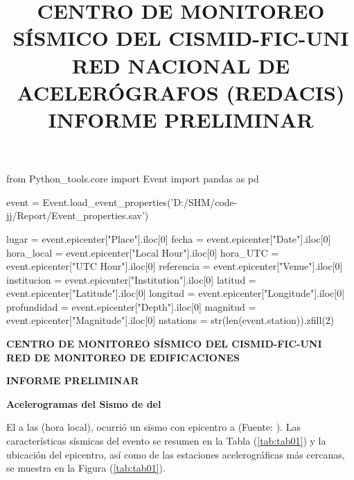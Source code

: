 \documentclass[11pt, a4paper]{report}
\title{CENTRO DE MONITOREO SÍSMICO DEL CISMID-FIC-UNI \\
RED NACIONAL DE ACELERÓGRAFOS (REDACIS)\\
INFORME PRELIMINAR\\
}
\begin{document}
\begin{pycode}
from Python_tools.core import Event
import pandas as pd

event = Event.load_event_properties('D:/SHM/code-jj/Report/Event_properties.sav')

lugar = event.epicenter["Place"].iloc[0]
fecha = event.epicenter["Date"].iloc[0]
hora_local = event.epicenter["Local Hour"].iloc[0]
hora_UTC = event.epicenter["UTC Hour"].iloc[0]
referencia = event.epicenter["Venue"].iloc[0]
institucion = event.epicenter["Institution"].iloc[0]
latitud = event.epicenter["Latitude"].iloc[0]
longitud = event.epicenter["Longitude"].iloc[0]
profundidad =  event.epicenter["Depth"].iloc[0]
magnitud = event.epicenter["Magnitude"].iloc[0]
nstations = str(len(event.station)).zfill(2)

\end{pycode}

\begin{center}
\centering 
\textbf{CENTRO DE MONITOREO SÍSMICO DEL CISMID-FIC-UNI \\
RED DE MONITOREO DE EDIFICACIONES}
\vspace{0.3cm}

\textbf{INFORME PRELIMINAR}
\vspace{0.3cm}

\textbf{Acelerogramas del Sismo de  del }
\vspace{0.25cm}
\end{center}

El  a las  (hora local), ocurrió un sismo con epicentro a  (Fuente: ). Las características sísmicas del evento 
se resumen en la Tabla (\ref{tab:tab01}) y la ubicación del epicentro, así como de las estaciones 
acelerográficas más cercanas, se muestra en la Figura (\ref{tab:tab01}). \\
\end{document}
